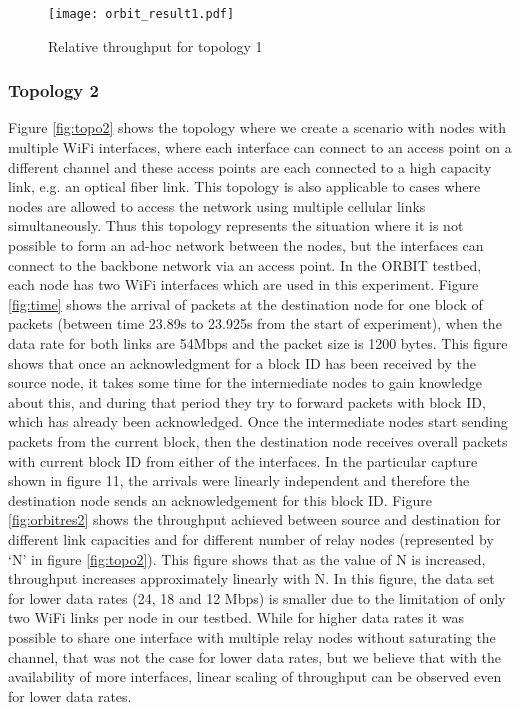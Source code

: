 \documentclass{sig-alternate-10pt}
\begin{document}
\begin{figure}[t]
\texttt{[image: orbit\_result1.pdf]}
\caption{Relative throughput for topology 1}
\label{fig:orbitres1}
\end{figure}

\subsubsection{Topology 2}
Figure \ref{fig:topo2} shows the topology where we create a scenario with nodes with multiple WiFi interfaces, where each interface can connect to an access point on a different channel and these access points are each connected to a high capacity link, e.g. an optical fiber link. This topology is also applicable to cases where nodes are allowed to access the network using multiple cellular links simultaneously. Thus this topology represents the situation where it is not possible to form an ad-hoc network between the nodes, but the interfaces can connect to the backbone network via an access point. In the ORBIT testbed, each node has two WiFi interfaces which are used in this experiment. Figure \ref{fig:time} shows the arrival of packets at the destination node for one block of packets (between time 23.89s to 23.925s from the start of experiment), when the data rate for both links are 54Mbps and the packet size is 1200 bytes. This figure shows that once an acknowledgment for a block ID has been received by the source node, it takes some time for the intermediate nodes to gain knowledge about this, and during that period they try to forward packets with  block ID, which has already been acknowledged. Once the intermediate nodes start sending  packets from the current block, then the destination node receives overall  packets with current block ID from either of the interfaces. In the particular capture shown in figure 11, the arrivals were linearly independent and therefore the destination node sends an acknowledgement for this block ID. Figure \ref{fig:orbitres2} shows the throughput achieved between  source and  destination for different link capacities and for different number of relay nodes (represented by `N' in figure \ref{fig:topo2}). This figure shows that as the value of N is increased, throughput  increases approximately linearly with N. In this figure, the data set for lower data rates (24, 18 and 12 Mbps) is smaller due to the limitation of only two WiFi links per node in our testbed. While for higher data rates it was possible to share one interface with multiple relay nodes without saturating the channel, that was not the case for lower data rates, but we believe that with the availability of more interfaces, linear scaling of throughput can be observed even for lower data rates. 
\end{document}
